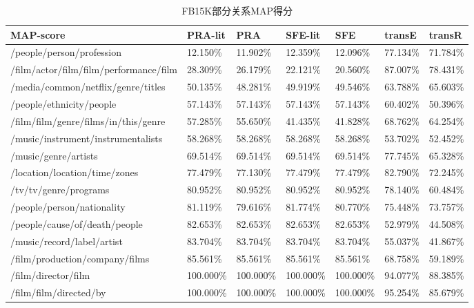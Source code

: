 \begin{table}[htbp]
  \centering
  \caption{FB15K部分关系MAP得分}
    \begin{tabular}{|p{5.8cm}|p{1.4cm}|p{1.4cm}|p{1.4cm}|p{1.4cm}|p{1.4cm}|p{1.4cm}|} %
    \hline
    MAP-score & \multicolumn{1}{l|}{PRA-lit  } & \multicolumn{1}{l|}{PRA} & \multicolumn{1}{l|}{SFE-lit} & \multicolumn{1}{l|}{SFE} & \multicolumn{1}{l|}{transE} & \multicolumn{1}{l|}{transR} \\
    \hline
    /people/person/profession & 12.150\% & 11.902\% & 12.359\% & 12.096\% & 77.134\% & 71.784\% \\
    \hline
    /film/actor/film/film/performance/film & 28.309\% & 26.179\% & 22.121\% & 20.560\% & 87.007\% & 78.431\% \\
    \hline
    /media/common/netflix/genre/titles & 50.135\% & 48.281\% & 49.919\% & 49.546\% & 63.788\% & 65.603\% \\
    \hline
    /people/ethnicity/people & 57.143\% & 57.143\% & 57.143\% & 57.143\% & 60.402\% & 50.396\% \\
    \hline
    /film/film/genre/films/in/this/genre & 57.285\% & 55.650\% & 41.435\% & 41.828\% & 68.762\% & 64.254\% \\
    \hline
    /music/instrument/instrumentalists & 58.268\% & 58.268\% & 58.268\% & 58.268\% & 53.702\% & 52.452\% \\
    \hline
    /music/genre/artists & 69.514\% & 69.514\% & 69.514\% & 69.514\% & 77.745\% & 65.328\% \\
    \hline
    /location/location/time/zones & 77.479\% & 77.130\% & 77.479\% & 77.479\% & 82.790\% & 72.245\% \\
    \hline
    /tv/tv/genre/programs & 80.952\% & 80.952\% & 80.952\% & 80.952\% & 78.140\% & 60.484\% \\
    \hline
    /people/person/nationality & 81.119\% & 79.616\% & 81.774\% & 80.770\% & 75.448\% & 73.757\% \\
    \hline
    /people/cause/of/death/people & 82.653\% & 82.653\% & 82.653\% & 82.653\% & 52.979\% & 44.508\% \\
    \hline
    /music/record/label/artist & 83.704\% & 83.704\% & 83.704\% & 83.704\% & 55.037\% & 41.867\% \\
    \hline
    /film/production/company/films & 85.561\% & 85.561\% & 85.561\% & 85.561\% & 68.758\% & 59.189\% \\
    \hline
    /film/director/film & 100.000\% & 100.000\% & 100.000\% & 100.000\% & 94.077\% & 88.385\% \\
    \hline
    /film/film/directed/by & 100.000\% & 100.000\% & 100.000\% & 100.000\% & 95.254\% & 85.679\% \\
    \hline
    \end{tabular}%
  \label{tab:addlabel-fb-map}%
\end{table}%


